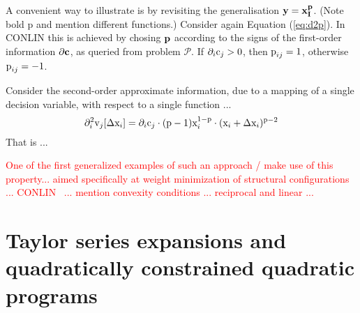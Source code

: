 \documentclass[11pt]{article}
\begin{document}
A convenient way to illustrate is by revisiting the generalisation $\mathbf{y} = \mathbf{x}_{\mathbf{I}}^{\mathbf{p}}$. (Note bold p and mention different functions.) Consider again Equation (\ref{eq:d2p}). In CONLIN this is achieved by chosing $\mathbf{p}$ according to the signs of the first-order information $\partial \mathbf{c}$, as queried from problem $\mathcal{P}$. If $\partial_i \textrm{c}_j > 0$, then $\textrm{p}_{ij} = 1$, otherwise $\textrm{p}_{ij}=-1$. 

Consider the second-order approximate information, due to a mapping of a single decision variable, with respect to a single function ... 
\begin{equation}
\partial_{i}^2 \textrm{v}_j[\Delta \textrm{x}_i] = \partial_i \textrm{c}_j \cdot (\textrm{p}-1)\textrm{x}_i^{1-\textrm{p}} \cdot (\textrm{x}_i +\Delta\textrm{x}_i)^{\textrm{p}-2}
\end{equation}
That is ... 



\textcolor{red}{One of the first generalized examples of such an approach / make use of this property... aimed specifically at weight minimization of structural configurations ...  CONLIN~\cite{fleury1986structural,fleury1989conlin} ... mention convexity conditions ... reciprocal and linear ... }



\section{Taylor series expansions and quadratically constrained quadratic programs}
\end{document}
